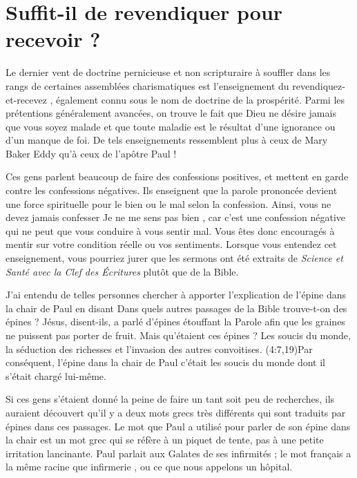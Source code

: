 \section{Suffit-il de revendiquer pour recevoir ?}

Le dernier vent de doctrine pernicieuse et non scripturaire à \linebreak
 souffler dans les rangs de certaines assemblées charismatiques
 est l'en\-sei\-gne\-ment du \Og revendiquez-et-recevez \Fg{},
 également connu sous le nom de doctrine de la prospérité.
 Parmi les prétentions généralement avancées, on trouve le fait
 que Dieu ne désire jamais que vous soyez malade et que toute maladie
 est le résultat d'une ignorance ou d'un manque de foi.
 De tels enseignements ressemblent plus à ceux de Mary Baker Eddy
 qu'à ceux de l'apôtre Paul !

Ces gens parlent beaucoup de faire des confessions positives,
 et mettent en garde contre les confessions négatives.
 Ils enseignent que la parole prononcée devient une force spirituelle
 pour le bien ou le mal selon la confession.
 Ainsi, vous ne devez jamais confesser\frcolon{} \Og Je ne me sens pas bien \Fg{},
 car c'est une confession négative qui ne peut que vous conduire à vous sentir mal.
 Vous êtes donc encouragés à mentir sur votre condition réelle
 ou vos sentiments. Lorsque vous entendez cet enseignement,
 vous pourriez jurer que les sermons ont été extraits
 de \emph{Science et Santé avec la Clef des Écritures} plutôt que de la Bible.

J'ai entendu de telles personnes chercher à apporter l'explication
 de l'épine dans la chair de Paul en disant\frcolon{}
 \Og Dans quels autres passages de la Bible trouve-t-on des épines ?
 Jésus, disent-ils, a parlé d'épines étouffant la Parole afin
 que les graines ne puissent pas porter de fruit. \Fg{}
 Mais qu'étaient ces épines ? Les soucis du monde,
 la séduction des richesses et l'invasion des autres convoitises.
 (4:7,19)Par conséquent, l'épine dans la chair de Paul
 c'était les soucis du monde dont il s'était chargé lui-même.

Si ces gens s'étaient donné la peine de faire un tant soit peu de recherches,
 ils auraient découvert qu'il y a deux mots grecs très différents
 qui sont traduits par \Og épines \Fg{} dans ces passages.
 Le mot que Paul a utilisé pour parler de son épine dans la chair
 est un mot grec qui se réfère à un piquet de tente,
 pas à une petite irritation lancinante.
 Paul parlait aux Galates de ses infirmités ;
 le mot français a la même racine que \Og infirmerie \Fg{},
 ou ce que nous appelons un hôpital.

